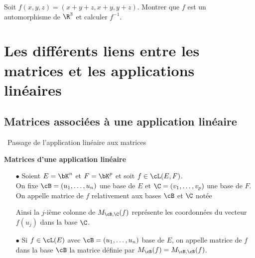 \documentclass[a4paper, 11pt]{article}
\begin{document}
{\footnotesize \begin{exercice} Soit $f(x,y,z)=(x+y+z,x+y,y+z)$. Montrer que $f$ est un automorphisme de $\R^3$ et calculer $f^{-1}$. 
\end{exercice}
}



\section{Les diff\'erents liens entre les matrices et les applications lin\'eaires}

\subsection{Matrices associ\'ees \`{a} une application lin\'eaire}

\noindent\ {Passage de l'application lin\'eaire aux matrices}\\

 {\noindent  

\begin{defi} \textbf{Matrices d'une application lin\'eaire}
\begin{itemize}
\item[$\bullet$] Soient $E=\bK^n$ et $F=\bK^p$ et soit $f\in\cL(E,F)$.\\
\noindent  On fixe $\cB=(u_1,\dots, u_n)$ une base de $E$ et $\C=(v_1,\dots, v_p)$ une base de $F$.\\
\noindent On appelle matrice de $f$ relativement aux bases $\cB$ et $\C$ not\'ee \dotfill\\
\vspace{4cm}


Ainsi la $j$-i\`eme colonne de $M_{\cB,\C}(f)$ repr\'esente les coordonn\'ees du vecteur $f(u_j)$ dans la base $\C$.
\item[$\bullet$] Si $f\in\cL(E)$ avec $\cB=(u_1,\dots, u_n)$ base de $E$, on appelle matrice de $f$ dans la base $\cB$ la matrice d\'efinie par $M_{\cB}(f)=M_{\cB,\cB}(f)$.



\end{itemize}
\end{defi}
 }\vsec
\end{document}
